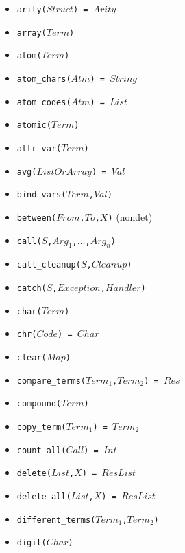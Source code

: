 \documentclass[10pt]{article}
\begin{document}
\begin{multicols}{2}
\begin{scriptsize}
\begin{itemize}
    \item \texttt{arity($Struct$) = $Arity$}
    \item \texttt{array($Term$)} 
    \item \texttt{atom($Term$)} 
    \item \texttt{atom\_chars($Atm$) = $String$}
    \item \texttt{atom\_codes($Atm$) = $List$} 
    \item \texttt{atomic($Term$)} 
    \item \texttt{attr\_var($Term$)} 
    \item \texttt{avg($ListOrArray$) = $Val$}
    \item \texttt{bind\_vars($Term$,$Val$)}
    \item \texttt{between($From$,$To$,$X$)} (nondet)
    \item \texttt{call($S$,$Arg_1$,$\ldots$,$Arg_n$)} 
    \item \texttt{call\_cleanup($S$,$Cleanup$)} 
    \item \texttt{catch($S$,$Exception$,$Handler$)} 
    \item \texttt{char($Term$)} 
    \item \texttt{chr($Code$) = $Char$} 
    \item \texttt{clear($Map$)} 
    \item \texttt{compare\_terms($Term_1$,$Term_2$) = $Res$} 
    \item \texttt{compound($Term$)} 
    \item \texttt{copy\_term($Term_1$) = $Term_2$}
    \item \texttt{count\_all($Call$) = $Int$}
    \item \texttt{delete($List$,$X$) = $ResList$}
    \item \texttt{delete\_all($List$,$X$) = $ResList$}
    \item \texttt{different\_terms($Term_1$,$Term_2$)}
    \item \texttt{digit($Char$)}

\end{itemize}
\end{scriptsize}
\end{multicols}
\end{document}
